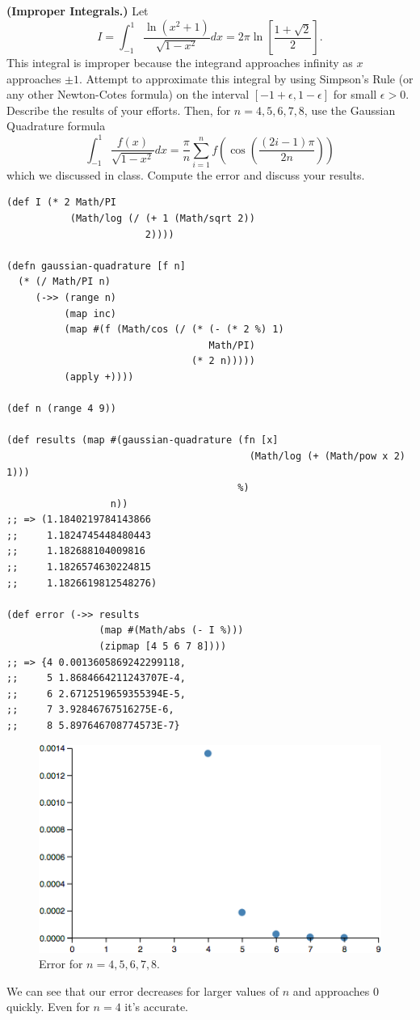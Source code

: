 \textbf{(Improper Integrals.)} Let \[
I = \int_{-1}^1 \frac{\ln (x^2 + 1 )}{\sqrt{1 - x^2}} dx = 2 \pi \ln
\left[ \frac{1 + \sqrt{2}}{2} \right].
\]
This integral is improper because the integrand approaches infinity as
$x$ approaches $\pm 1$. Attempt to approximate this integral by using
Simpson's Rule (or any other Newton-Cotes formula) on the interval
$[-1 + \epsilon, 1 - \epsilon]$ for small $\epsilon > 0$. Describe the
results of your efforts. Then, for $n = 4, 5, 6, 7, 8$, use the
Gaussian Quadrature formula \[
\int_{-1}^1 \frac{f(x)}{\sqrt{1 - x^2}} dx = \frac{\pi}{n}
\sum_{i=1}^n f\left( \cos \left( \frac{(2i - 1) \pi}{2n} \right) \right)
\] which we discussed in class. Compute the error and discuss your results.

{\color{blue}

\begin{verbatim}
(def I (* 2 Math/PI
           (Math/log (/ (+ 1 (Math/sqrt 2))
                        2))))

(defn gaussian-quadrature [f n]
  (* (/ Math/PI n)
     (->> (range n)
          (map inc)
          (map #(f (Math/cos (/ (* (- (* 2 %) 1)
                                   Math/PI)
                                (* 2 n)))))
          (apply +))))

(def n (range 4 9))

(def results (map #(gaussian-quadrature (fn [x]
                                          (Math/log (+ (Math/pow x 2) 1)))
                                        %)
                  n))
;; => (1.1840219784143866
;;     1.1824745448480443
;;     1.182688104009816
;;     1.1826574630224815
;;     1.1826619812548276)

(def error (->> results
                (map #(Math/abs (- I %)))
                (zipmap [4 5 6 7 8])))
;; => {4 0.0013605869242299118,
;;     5 1.8684664211243707E-4,
;;     6 2.6712519659355394E-5,
;;     7 3.92846767516275E-6,
;;     8 5.897646708774573E-7}
\end{verbatim}

\begin{figure}[H]
\centering
\includegraphics[scale=0.65]{improper-integrals-error.png}
\caption{Error for $n=4,5,6,7,8$.}
\end{figure}

We can see that our error decreases for larger values of $n$ and
approaches $0$ quickly. Even for $n=4$ it's accurate.
}
